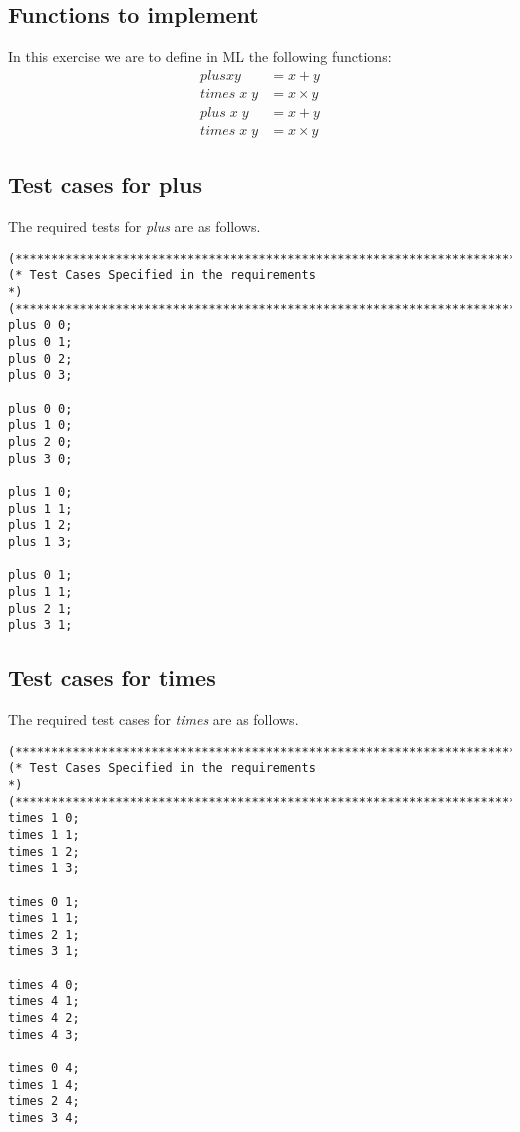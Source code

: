 \documentclass{report}
\begin{document}
\subsection{Functions to implement}
\label{sec:functions-implement}

In this exercise we are to define in ML the following functions:
\begin{align}
  plus x y &= x + y\\
  times \;x\;y &= x \times y\\
  plus \;x\;y &= x + y\\
  times \;x\;y &= x \times y
\end{align}

\subsection{Test cases for plus}
\label{sec:test-cases-plus}

The required tests for \emph{plus} are as follows.
\begin{lstlisting}[frame=TB]
(******************************************************************************)
(* Test Cases Specified in the requirements                                   *)
(******************************************************************************)
plus 0 0;
plus 0 1;
plus 0 2;
plus 0 3;

plus 0 0;
plus 1 0;
plus 2 0;
plus 3 0;

plus 1 0;
plus 1 1;
plus 1 2;
plus 1 3;

plus 0 1;
plus 1 1;
plus 2 1;
plus 3 1;
 \end{lstlisting}

\subsection{Test cases for times}
\label{sec:test-cases-times}

The required test cases for \emph{times} are as follows.
\begin{lstlisting}[frame = TB]
(******************************************************************************)
(* Test Cases Specified in the requirements                                   *)
(******************************************************************************)
times 1 0;
times 1 1;
times 1 2;
times 1 3;

times 0 1;
times 1 1;
times 2 1;
times 3 1;

times 4 0;
times 4 1;
times 4 2;
times 4 3;

times 0 4;
times 1 4;
times 2 4;
times 3 4;  
\end{lstlisting}
\end{document}
